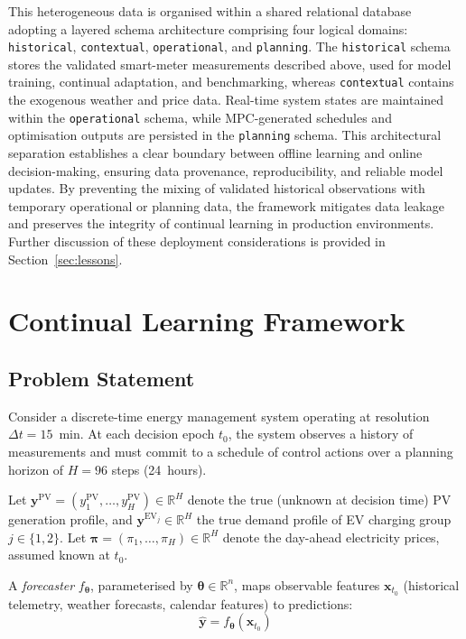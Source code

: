 \documentclass[journal]{IEEEtran}
\begin{document}
This heterogeneous data is organised within a shared relational
database adopting a layered schema architecture comprising four
logical domains: \texttt{historical}, \texttt{contextual},
\texttt{operational}, and \texttt{planning}. The \texttt{historical}
schema stores the validated smart-meter measurements described above,
used for model training, continual adaptation, and benchmarking,
whereas \texttt{contextual} contains the exogenous weather and price
data. Real-time system states are maintained within the
\texttt{operational} schema, while MPC-generated schedules and
optimisation outputs are persisted in the \texttt{planning} schema.
This architectural separation establishes a clear boundary between
offline learning and online decision-making, ensuring data provenance,
reproducibility, and reliable model updates. By preventing the mixing
of validated historical observations with temporary operational or
planning data, the framework mitigates data leakage and preserves the
integrity of continual learning in production environments. Further
discussion of these deployment considerations is provided in
Section~\ref{sec:lessons}.
\section{Continual Learning Framework}
\label{sec:clframework}

\subsection{Problem Statement}
\label{sec:problem}

Consider a discrete-time energy management system operating at resolution
$\Delta t = 15$~min. At each decision epoch $t_0$, the system observes
a history of measurements and must commit to a schedule of control
actions over a planning horizon of $H = 96$ steps (24~hours).

Let $\mathbf{y}^{\mathrm{PV}} = (y_1^{\mathrm{PV}}, \ldots, y_H^{\mathrm{PV}}) \in \mathbb{R}^H$
denote the true (unknown at decision time) PV generation profile, and
$\mathbf{y}^{\mathrm{EV}_j} \in \mathbb{R}^H$ the true demand profile
of EV charging group $j \in \{1, 2\}$. Let $\boldsymbol{\pi} = (\pi_1,
\ldots, \pi_H) \in \mathbb{R}^H$ denote the day-ahead electricity
prices, assumed known at $t_0$.

A \emph{forecaster} $f_{\boldsymbol{\theta}}$, parameterised by
$\boldsymbol{\theta} \in \mathbb{R}^n$, maps observable features
$\mathbf{x}_{t_0}$ (historical telemetry, weather forecasts, calendar
features) to predictions:
\begin{equation}
    \hat{\mathbf{y}} = f_{\boldsymbol{\theta}}(\mathbf{x}_{t_0})
    \label{eq:forecaster}
\end{equation}
\end{document}
